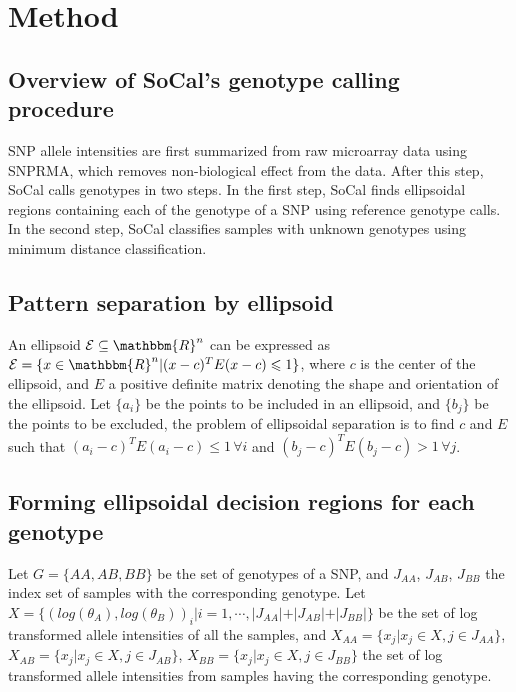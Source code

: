\documentclass{scrartcl}
\begin{document}










\section{Method}

\subsection{Overview of SoCal's genotype calling procedure}

\par
SNP allele intensities are first summarized from raw microarray data using
SNPRMA, which removes non-biological effect from the data.
After this step, SoCal calls genotypes in two steps.
In the first step, SoCal finds ellipsoidal regions containing each of the
genotype of a SNP using reference genotype calls.
In the second step, SoCal classifies samples with unknown genotypes using
minimum distance classification.

\subsection{Pattern separation by ellipsoid}

\par
An ellipsoid $\mathcal{E} \subseteq \mathbbm{R}^{n}$ can be expressed as
$\mathcal{E} = \{x \in \mathbbm{R}^{n} | (x-c)^TE(x-c)\leqslant1\}$, where
$c$ is the center of the ellipsoid, and $E$ a positive definite matrix
denoting the shape and orientation of the ellipsoid.
Let $\{a_i\}$ be the points to be included in an ellipsoid, and $\{b_j\}$
be the points to be excluded, the problem of ellipsoidal separation is to find
$c$ and $E$ such that $(a_i-c)^TE(a_i-c)\leqslant1 \, \forall i$ and
$(b_j-c)^TE(b_j-c)>1 \, \forall j$.

\subsection{Forming ellipsoidal decision regions for each genotype}

\par
Let $G=\{AA,AB,BB\}$ be the set of genotypes of a SNP, and $J_{AA}$, $J_{AB}$,
$J_{BB}$ the index set of samples with the corresponding genotype.
Let $X=\{(log(\theta_A),log(\theta_B))_i|i=1,\cdots,
|J_{AA}|+|J_{AB}|+|J_{BB}|\}$ be the set of log transformed allele intensities
of all the samples, and $X_{AA}=\{x_j|x_j \in X, j \in J_{AA}\}$,
$X_{AB}=\{x_j|x_j \in X, j \in J_{AB}\}$,
$X_{BB}=\{x_j|x_j \in X, j \in J_{BB}\}$ the set of log transformed allele
intensities from samples having the corresponding genotype.
\end{document}
